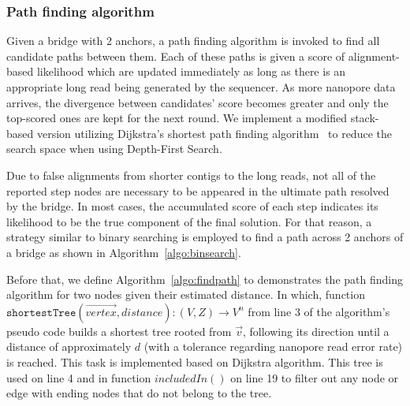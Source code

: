 \documentclass[10pt,letterpaper]{article}
\begin{document}
\subsubsection*{Path finding algorithm}
Given a bridge with 2 anchors, a path finding algorithm is invoked to find all candidate paths between them. Each of these paths is given a score of alignment-based likelihood which are updated immediately as long as there is an appropriate long read being generated by the sequencer. As more nanopore data arrives, the divergence between candidates' score becomes greater and only the top-scored ones are kept for the next round.
We implement a modified stack-based version utilizing Dijkstra's shortest path finding algorithm~\cite{Dijkstra1959} to reduce the search space when using Depth-First Search.

Due to false alignments from shorter contigs to the long reads, not all of the reported step nodes are necessary to be appeared in the ultimate path resolved by the bridge. 
In most cases, the accumulated score of each step indicates its likelihood to be the true component of the final solution.
For that reason, a strategy similar to binary searching is employed to find a path across 2 anchors of a bridge as shown in Algorithm~\ref{algo:binsearch}.


Before that, we define Algorithm~\ref{algo:findpath} to demonstrates the path finding algorithm for two nodes given their estimated distance. In which, function 
$\mathtt{shortestTree}(\overrightarrow{vertex},distance) : (V,Z) \rightarrow V^n$ 
from line 3 of the algorithm's pseudo code builds a shortest tree rooted from $\overrightarrow{v}$, following its direction until a distance of approximately $d$ (with a tolerance regarding nanopore read error rate) is reached. This task is implemented based on Dijkstra algorithm.
This tree is used on line 4 and in function $includedIn()$ on line 19 to filter out any node or edge with ending nodes that do not belong to the tree.
\end{document}
